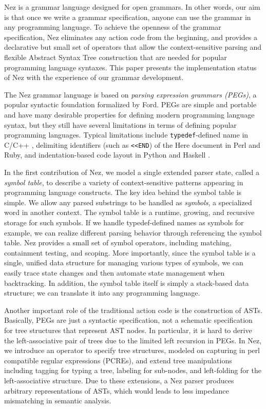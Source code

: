 \documentclass[preprint]{sigplanconf}
\begin{document}
Nez is a grammar language designed for open grammars. In other words, our aim is that once we write a grammar specification, anyone can use the grammar in any programming language. To achieve the openness of the grammar specification, Nez eliminates any action code from the beginning, and provides a declarative but small set of operators that allow the context-sensitive parsing and flexible Abstract Syntax Tree construction that are needed for popular programming language syntaxes. This paper presents the implementation status of Nez with the experience of our grammar development.

The Nez grammar language is based on {\em parsing expression grammars (PEGs)}, a popular syntactic foundation formalized by Ford\cite{POPL04_PEG}. PEGs are simple and portable and have many desirable properties for defining modern programming language syntax, but they still have several limitations in terms of defining popular programming languages. Typical limitations include {\tt typedef}-defined name in C/C++ \cite{POPL04_PEG,PLDI06_Rats}, delimiting identifiers (such as \verb|<<END|) of the Here document in Perl and Ruby, and indentation-based code layout in Python and Haskell \cite{POPL13_Indentation}. 

In the first contribution of Nez, we model a single extended parser state, called a {\em symbol table}, to describe a variety of context-sensitive patterns appearing in programming language constructs. 
The key idea behind the symbol table is simple. We allow any parsed substrings to be handled as {\em symbols}, a specialized word in another context. The symbol table is a runtime, growing, and recursive storage for such symbols. If we handle typedef-defined names as symbols for example, we can realize different parsing behavior through referencing the symbol table. 
Nez provides a small set of symbol operators, including matching, containment testing, and scoping. 
More importantly, since the symbol table is a single, unified data structure for managing various types of symbols, we can easily trace state changes and then automate state management when backtracking. In addition, the symbol table itself is simply a stack-based data structure;  we can translate it into any programming language. 

Another important role of the traditional action code is the construction of ASTs. Basically, PEGs are just a syntactic specification, not a schematic specification for tree structures that represent AST nodes. In particular, it is hard to derive the left-associative pair of trees due to the limited left recursion in PEGs. In Nez, we introduce an operator to specify tree structures, modeled on capturing in perl compatible regular expressions (PCREs), and extend tree manipulations including tagging for typing a tree, labeling for sub-nodes, and left-folding for the left-associative structure. Due to these extensions, a Nez parser produces arbitrary representations of ASTs, which would leads to less impedance mismatching in semantic analysis.
 
\end{document}
